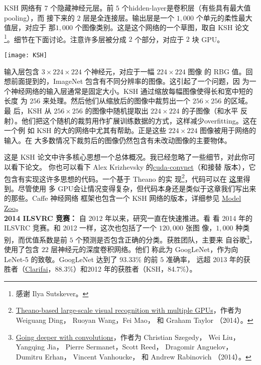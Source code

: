 KSH 网络有 $7$ 个隐藏神经元层。前 $5$ 个\gls*{hidden-layer}是卷积层（有些具有最大值\gls*{pooling}），而
接下来的 $2$ 层是全连接层。输出层是一个 $1,000$ 个单元的柔性最大值层，对应于
那$1,000$ 个图像类别。这是这个网络的一个草图，取自 KSH 论文\footnote{感谢 Ilya
  Sutskever。}。细节在下面讨论。注意许多层被分成 $2$ 个部分，对应于 $2$ 块 GPU。
\begin{center}
\texttt{[image: KSH]}
\end{center}

输入层包含 $3 \times 224 \times 224$ 个神经元，对应于一幅 $224 \times 224$ 图像
的 RBG 值。回想前面提到的，ImageNet 包含有不同分辨率的图像。这引起了一个问题，因
为一个神经网络的输入层通常是固定大小。KSH 通过缩放每幅图像使得长和宽中短的长度
为 $256$ 来处理。然后他们从缩放后的图像中裁剪出一个 $256 \times 256$ 的区域。最
后，KSH 从 $256 \times 256$ 的图像中随机提取出 $224 \times 224$ 的子图像（和水平
反射）。他们把这个随机的裁剪用作扩展训练数据的方式，这样减少\gls*{overfitting}。这在一个例
如 KSH 的大的网络中尤其有帮助。正是这些 $224 \times 224$ 图像被用于网络的输入。在
大多数情况下裁剪后的图像仍然包含有未改动图像的主要物体。

这是 KSH 论文中许多核心思想一个总体概况。我已经忽略了一些细节，对此你可以看下论文。
你也可以看下 Alex
Krizhevsky 的\href{https://code.google.com/p/cuda-convnet/}{cuda-convnet}（和接替
版本），它包含有实现这许多思想的代码。一个基于 Theano 的实
现\footnote{\href{http://arxiv.org/abs/1412.2302}{Theano-based large-scale
    visual recognition with multiple GPUs}，作者为 Weiguang Ding， Ruoyan
  Wang，Fei Mao， 和 Graham Taylor （2014）。}，代码可以在%
\href{https://github.com/uoguelph-mlrg/theano_alexnet}{这里}得到。尽管使用
多 GPU会让情况变得复杂，但代码本身还是类似于这章我们写出来的那些。Caffe 神经网络
框架也包含一个 KSH 网络的版本，详细参见
\href{http://caffe.berkeleyvision.org/model_zoo.html}{Model Zoo}。\\

\textbf{2014 ILSVRC 竞赛：} 自 2012 年以来，研究一直在快速推进。看
看 2014 年的ILSVRC 竞赛。和 2012 一样，这次也包括了一个 $120,000$ 张图
像，$1,000$ 种类别，而优值系数是前 $5$ 个预测是否包含正确的分类。获胜团队，主要来
自谷歌\footnote{\href{http://arxiv.org/abs/1409.4842}{Going deeper with
    convolutions}，作者为 Christian Szegedy， Wei Liu， Yangqing Jia， Pierre
  Sermanet，Scott Reed， Dragomir Anguelov， Dumitru Erhan， Vincent Vanhoucke，
  和 Andrew Rabinovich （2014）。}，使用了包含 $22$ 层神经元的深度卷积网络。他们
称此为 GoogLeNet，作为向 LeNet-5 的致敬。GoogLeNet 达到了 93.33\% 的前 $5$ 准确率，
远超 2013 年的获胜者（\href{http://www.clarifai.com/}{Clarifai}，88.3\%）和2012
年的获胜者（KSH，84.7\%）。

